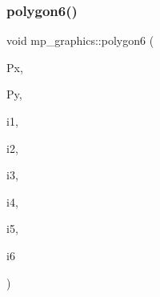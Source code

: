 \mbox{\label{classmp__graphics_aed83ee1de24a8898f33a8b921343fa54}} 
\subsubsection{\texorpdfstring{polygon6()}{polygon6()}}
{\footnotesize\ttfamily void mp\+\_\+graphics\+::polygon6 (\begin{DoxyParamCaption}\item[{\mbox{\hyperlink{galois_8h_a09fddde158a3a20bd2dcadb609de11dc}{I\+NT}} $\ast$}]{Px,  }\item[{\mbox{\hyperlink{galois_8h_a09fddde158a3a20bd2dcadb609de11dc}{I\+NT}} $\ast$}]{Py,  }\item[{\mbox{\hyperlink{galois_8h_a09fddde158a3a20bd2dcadb609de11dc}{I\+NT}}}]{i1,  }\item[{\mbox{\hyperlink{galois_8h_a09fddde158a3a20bd2dcadb609de11dc}{I\+NT}}}]{i2,  }\item[{\mbox{\hyperlink{galois_8h_a09fddde158a3a20bd2dcadb609de11dc}{I\+NT}}}]{i3,  }\item[{\mbox{\hyperlink{galois_8h_a09fddde158a3a20bd2dcadb609de11dc}{I\+NT}}}]{i4,  }\item[{\mbox{\hyperlink{galois_8h_a09fddde158a3a20bd2dcadb609de11dc}{I\+NT}}}]{i5,  }\item[{\mbox{\hyperlink{galois_8h_a09fddde158a3a20bd2dcadb609de11dc}{I\+NT}}}]{i6 }\end{DoxyParamCaption})}

\mbox{\label{classmp__graphics_a7e9306aaee8234c952306f4e4d4bd7c0}} 
